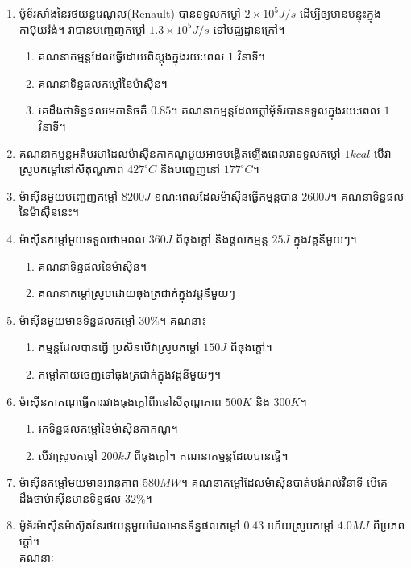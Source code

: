 \begin{enumerate}
\begin{enumerate}
	\end{enumerate}
	\item ម៉ូទ័រសាំងនៃរថយន្តរេណូល{\en(Renault)} បានទទួលកម្តៅ $2\times10^{5}J/s$ ដើម្បីឲ្យមានបន្ទុះក្នុងកាប៊ុយរ៉ង់។ វាបានបញ្ចេញកម្តៅ $1.3\times10^{5}J/s$ ទៅមជ្ឈដ្ឋានក្រៅ។
	\begin{enumerate}
		\item គណនាកម្មន្តដែលធ្វើដោយពិស្តុងក្នុងរយៈពេល $1$ វិនាទី។
		\item គណនាទិន្នផលកម្តៅនៃម៉ាសុីន។
		\item គេដឹងថាទិន្នផលមេកានិចគឺ $0.85$។ គណនាកម្មន្តដែលភ្លៅម៉័ទ័របានទទួលក្នុងរយៈពេល $1$ វិនាទី។
	\end{enumerate}  
	\item គណនាកម្មន្តអតិបរមាដែលម៉ាសុីនកាកណូមួយអាចបង្កើតឡើងពេលវាទទួលកម្តៅ $1kcal$ បើវាស្រូបកម្តៅនៅសីតុណ្ហភាព $427^\circ C$ និងបញ្ខេញនៅ $177^\circ C$។
	\item ម៉ាសុីនមួយបញ្ចេញកម្តៅ $8200J$ ខណៈពេលដែលម៉ាសុីនធ្វើកម្មន្តបាន $2600J$។ គណនាទិន្នផលនៃម៉ាសុីននេះ។
	\item ម៉ាសុីនកម្តៅមួយទទួលថាមពល $360J$ ពីធុងក្តៅ និងផ្តល់កម្មន្ត $25J$ ក្នុងវគ្គនីមួយៗ។
	\begin{enumerate}
		\item គណនាទិន្នផលនៃម៉ាសុីន។
		\item គណនាកម្តៅស្រូបដោយធុងត្រជាក់ក្នុងវដ្តនីមួយៗ
	\end{enumerate}
	\item ម៉ាសុីនមួយមានទិន្នផលកម្តៅ $30\%$។ គណនា៖
	\begin{enumerate}
		\item កម្មន្តដែលបានធ្វើ ប្រសិនបើវាស្រូបកម្តៅ $150J$ ពីធុងក្តៅ។
		\item កម្តៅភាយចេញទៅធុងត្រជាក់ក្នុងវដ្តនីមួយៗ។
	\end{enumerate}
	\item ម៉ាសុីនកាកណូធ្វើការរវាងធុងក្តៅពីរនៅសីតុណ្ហភាព $500K$ និង $300K$។ 
	\begin{enumerate}
		\item រកទិន្នផលកម្តៅនៃម៉ាសុីនកាកណូ។
		\item បើវាស្រូបកម្តៅ $200kJ$ ពីធុងក្តៅ។ គណនាកម្មន្តដែលបានធ្វើ។
	\end{enumerate}
	\item ម៉ាសុីនកម្តៅមយមានអានុភាព $580MW$។ គណនាកម្តៅដែលម៉ាសុីនបាត់បង់រាល់វិនាទី បើគេដឹងថាម់ាសុីនមានទិន្នផល $32\%$។
	\item ម៉ូទ័រម៉ាសុីនម៉ាស៊ូតនៃរថយន្តមួយដែលមានទិន្នផលកម្តៅ $0.43$ ហើយស្រូបកម្តៅ $4.0MJ$ ពីប្រភពក្តៅ។\\គណនាៈ
	\begin{enumerate}

\end{enumerate}
\end{enumerate}
